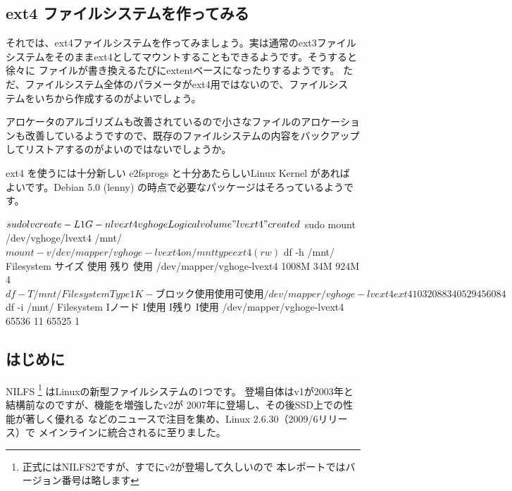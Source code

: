 \documentclass[mingoth,a4paper]{jsarticle}
\begin{document}
\subsection{ext4 ファイルシステムを作ってみる}

それでは、ext4ファイルシステムを作ってみましょう。実は通常のext3ファイル
システムをそのままext4としてマウントすることもできるようです。そうすると徐々に
ファイルが書き換えるたびにextentベースになったりするようです。
ただ、ファイルシステム全体のパラメータがext4用ではないので、ファイルシス
テムをいちから作成するのがよいでしょう。

アロケータのアルゴリズムも改善されているので小さなファイルのアロケーショ
ンも改善しているようですので、既存のファイルシステムの内容をバックアップ
してリストアするのがよいのではないでしょうか。

ext4 を使うには十分新しい e2fsprogs と十分あたらしいLinux Kernel があれば
よいです。Debian 5.0 (lenny) の時点で必要なパッケージはそろっているようです。

\begin{commandline}
 $ sudo lvcreate -L 1G -n lvext4 vghoge
  Logical volume "lvext4" created
 $ sudo mount /dev/vghoge/lvext4 /mnt/
 $ mount -v 
 /dev/mapper/vghoge-lvext4 on /mnt type ext4 (rw)
 $ df -h /mnt/
 Filesystem          サイズ  使用  残り 使用%
 /dev/mapper/vghoge-lvext4
                     1008M   34M  924M   4%
 $ df -T /mnt/ 
 Filesystem    Type   1K-ブロック    使用   使用可 使用%
 /dev/mapper/vghoge-lvext4
              ext4     1032088     34052    945608   4%
 $ df -i /mnt/
 Filesystem            Iノード  I使用   I残り I使用%
 /dev/mapper/vghoge-lvext4
                       65536      11   65525    1%
\end{commandline}



\subsection{はじめに}
NILFS
\footnote{正式にはNILFS2ですが、すでにv2が登場して久しいので
本レポートではバージョン番号は略します}
はLinuxの新型ファイルシステムの1つです。
登場自体はv1が2003年と結構前なのですが、機能を増強したv2が
2007年に登場し、その後SSD上での性能が著しく優れる\cite{nilbench}
などのニュースで注目を集め、Linux 2.6.30（2009/6リリース）で
メインラインに統合されるに至りました。
\end{document}

